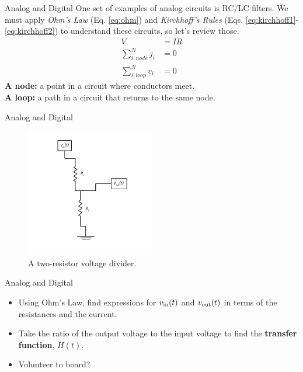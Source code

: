 \documentclass{beamer}
\begin{document}
\begin{frame}{Analog and Digital}
One set of examples of analog circuits is RC/LC filters.  We must apply \textit{Ohm's Law} (Eq. \ref{eq:ohm}) and \textit{Kirchhoff's Rules} (Eqs. \ref{eq:kirchhoff1}-\ref{eq:kirchhoff2}) to understand these circuits, so let's review those.
\begin{align}
V &= IR \label{eq:ohm} \\
\sum_{i,node}^N j_i &= 0 \label{eq:kirchhoff1} \\
\sum_{i,loop}^N v_{i} &= 0 \label{eq:kirchhoff2}
\end{align}
\textbf{A node:} a point in a circuit where conductors meet.\\
\textbf{A loop:} a path in a circuit that returns to the same node.
\end{frame}

\begin{frame}{Analog and Digital}
\begin{figure}
\centering
\includegraphics[width=0.5\textwidth]{AnalogExample/VoltageDivider.pdf}
\caption{\label{fig:example1} A two-resistor voltage divider.}
\end{figure}
\end{frame}

\begin{frame}{Analog and Digital}
\begin{itemize}
\item Using Ohm's Law, find expressions for $v_{\rm in}(t)$ and $v_{\rm out}(t)$ in terms of the resistances and the current.
\item Take the ratio of the output voltage to the input voltage to find the \textbf{transfer function}, $H(t)$.
\item Volunteer to board?
\end{itemize}
\end{frame}
\end{document}
